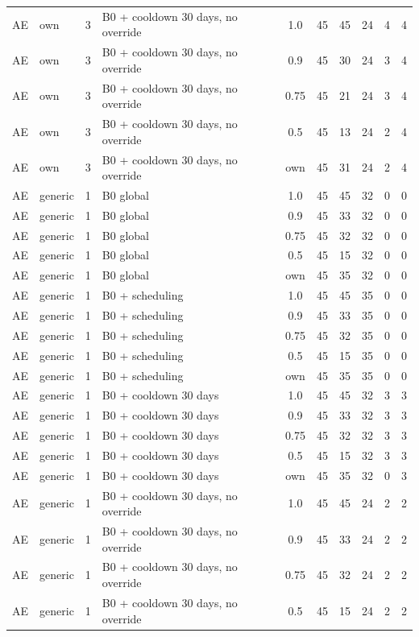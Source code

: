 \documentclass[10pt,onecolumn,letterpaper]{article}
\begin{document}
\begin{longtable}{lllp{4.4cm}cccccc}
AE & own & 3 & B0 + cooldown 30 days, no override & 1.0 & 45 & 45 & 24 & 4 & 4 \\
AE & own & 3 & B0 + cooldown 30 days, no override & 0.9 & 45 & 30 & 24 & 3 & 4 \\
AE & own & 3 & B0 + cooldown 30 days, no override & 0.75 & 45 & 21 & 24 & 3 & 4 \\
AE & own & 3 & B0 + cooldown 30 days, no override & 0.5 & 45 & 13 & 24 & 2 & 4 \\
AE & own & 3 & B0 + cooldown 30 days, no override & own & 45 & 31 & 24 & 2 & 4 \\
AE & generic & 1 & B0 global & 1.0 & 45 & 45 & 32 & 0 & 0 \\
AE & generic & 1 & B0 global & 0.9 & 45 & 33 & 32 & 0 & 0 \\
AE & generic & 1 & B0 global & 0.75 & 45 & 32 & 32 & 0 & 0 \\
AE & generic & 1 & B0 global & 0.5 & 45 & 15 & 32 & 0 & 0 \\
AE & generic & 1 & B0 global & own & 45 & 35 & 32 & 0 & 0 \\
AE & generic & 1 & B0 + scheduling & 1.0 & 45 & 45 & 35 & 0 & 0 \\
AE & generic & 1 & B0 + scheduling & 0.9 & 45 & 33 & 35 & 0 & 0 \\
AE & generic & 1 & B0 + scheduling & 0.75 & 45 & 32 & 35 & 0 & 0 \\
AE & generic & 1 & B0 + scheduling & 0.5 & 45 & 15 & 35 & 0 & 0 \\
AE & generic & 1 & B0 + scheduling & own & 45 & 35 & 35 & 0 & 0 \\
AE & generic & 1 & B0 + cooldown 30 days & 1.0 & 45 & 45 & 32 & 3 & 3 \\
AE & generic & 1 & B0 + cooldown 30 days & 0.9 & 45 & 33 & 32 & 3 & 3 \\
AE & generic & 1 & B0 + cooldown 30 days & 0.75 & 45 & 32 & 32 & 3 & 3 \\
AE & generic & 1 & B0 + cooldown 30 days & 0.5 & 45 & 15 & 32 & 3 & 3 \\
AE & generic & 1 & B0 + cooldown 30 days & own & 45 & 35 & 32 & 0 & 3 \\
AE & generic & 1 & B0 + cooldown 30 days, no override & 1.0 & 45 & 45 & 24 & 2 & 2 \\
AE & generic & 1 & B0 + cooldown 30 days, no override & 0.9 & 45 & 33 & 24 & 2 & 2 \\
AE & generic & 1 & B0 + cooldown 30 days, no override & 0.75 & 45 & 32 & 24 & 2 & 2 \\
AE & generic & 1 & B0 + cooldown 30 days, no override & 0.5 & 45 & 15 & 24 & 2 & 2 \\

\end{longtable}
\end{document}
